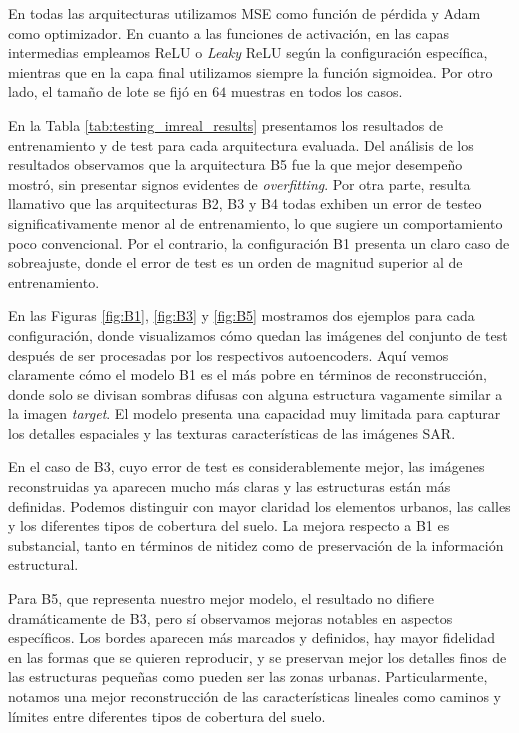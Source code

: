En todas las arquitecturas utilizamos MSE como función de pérdida y Adam como optimizador. En cuanto a las funciones de activación, en las capas intermedias empleamos ReLU o \emph{Leaky} ReLU según la configuración específica, mientras que en la capa final utilizamos siempre la función sigmoidea. Por otro lado, el tamaño de lote se fijó en $64$ muestras en todos los casos.

\vspace{1cm}


En la Tabla \ref{tab:testing_imreal_results} presentamos los resultados de entrenamiento y de test para cada arquitectura evaluada. Del análisis de los resultados observamos que la arquitectura B5 fue la que mejor desempeño mostró, sin presentar signos evidentes de \emph{overfitting}. Por otra parte, resulta llamativo que las arquitecturas B2, B3 y B4 todas exhiben un error de testeo significativamente menor al de entrenamiento, lo que sugiere un comportamiento poco convencional. Por el contrario, la configuración B1 presenta un claro caso de sobreajuste, donde el error de test es un orden de magnitud superior al de entrenamiento.

En las Figuras \ref{fig:B1}, \ref{fig:B3} y \ref{fig:B5} mostramos dos ejemplos para cada configuración, donde visualizamos cómo quedan las imágenes del conjunto de test después de ser procesadas por los respectivos autoencoders. Aquí vemos claramente cómo el modelo B1 es el más pobre en términos de reconstrucción, donde solo se divisan sombras difusas con alguna estructura vagamente similar a la imagen \emph{target}. El modelo presenta una capacidad muy limitada para capturar los detalles espaciales y las texturas características de las imágenes SAR.

En el caso de B3, cuyo error de test es considerablemente mejor, las imágenes reconstruidas ya aparecen mucho más claras y las estructuras están más definidas. Podemos distinguir con mayor claridad los elementos urbanos, las calles y los diferentes tipos de cobertura del suelo. La mejora respecto a B1 es substancial, tanto en términos de nitidez como de preservación de la información estructural.

Para B5, que representa nuestro mejor modelo, el resultado no difiere dramáticamente de B3, pero sí observamos mejoras notables en aspectos específicos. Los bordes aparecen más marcados y definidos, hay mayor fidelidad en las formas que se quieren reproducir, y se preservan mejor los detalles finos de las estructuras pequeñas como pueden ser las zonas urbanas. Particularmente, notamos una mejor reconstrucción de las características lineales como caminos y límites entre diferentes tipos de cobertura del suelo.

